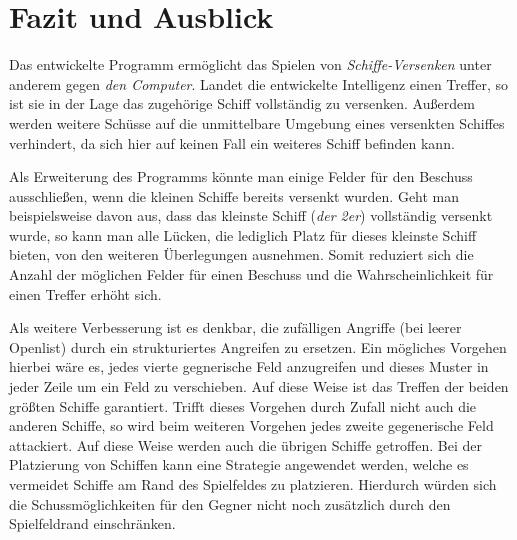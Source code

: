 \section{Fazit und Ausblick} \label{sec:Ausblick}

	Das entwickelte Programm ermöglicht das Spielen von \textit{Schiffe-Versenken} unter anderem gegen \textit{den Computer}. 
	Landet die entwickelte Intelligenz einen Treffer, so ist sie in der Lage das zugehörige Schiff vollständig zu versenken. 
	Außerdem werden weitere Schüsse auf die unmittelbare Umgebung eines versenkten Schiffes verhindert, da sich hier auf keinen Fall ein
	weiteres Schiff befinden kann.
	
	Als Erweiterung des Programms könnte man einige Felder für den Beschuss ausschließen, wenn die kleinen Schiffe bereits versenkt wurden.
	Geht man beispielsweise davon aus, dass das kleinste Schiff (\textit{der 2er}) vollständig versenkt wurde, so kann man alle 
	Lücken, die lediglich Platz für dieses kleinste Schiff bieten, von den weiteren Überlegungen ausnehmen. Somit reduziert sich die 
	Anzahl der möglichen Felder für einen Beschuss und die Wahrscheinlichkeit für einen Treffer erhöht sich.

	Als weitere Verbesserung ist es denkbar, die zufälligen Angriffe (bei leerer Openlist) durch ein strukturiertes Angreifen zu ersetzen.
	Ein mögliches Vorgehen hierbei wäre es, jedes vierte gegnerische Feld anzugreifen und dieses Muster in jeder Zeile um ein Feld zu verschieben.  
	Auf diese Weise ist das Treffen der beiden größten Schiffe garantiert. Trifft dieses Vorgehen durch Zufall nicht auch die anderen 
	Schiffe, so wird beim weiteren Vorgehen jedes zweite gegenerische Feld attackiert. Auf diese Weise werden auch die übrigen Schiffe getroffen.
	Bei der Platzierung von Schiffen kann eine Strategie angewendet werden, welche es vermeidet Schiffe am Rand des Spielfeldes zu platzieren. 
	Hierdurch würden sich die Schussmöglichkeiten für den Gegner nicht noch zusätzlich durch den Spielfeldrand einschränken.
	
		


